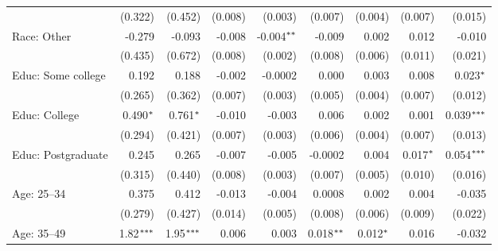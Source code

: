 \begin{table}[!ht]
\begin{adjustbox}{max width=\textwidth}
\begin{tabular}{@{\hspace{0\tabcolsep}}l*{8}{D{.}{.}{-1}}@{\hspace{0\tabcolsep}}}
                              & (0.322)       & (0.452)       & (0.008)       & (0.003)       & (0.007)                & (0.004)                & (0.007)       & (0.015)\\   
      Race: Other             & -0.279        & -0.093        & -0.008        & -0.004$\sym{**}$ & -0.009                 & 0.002                  & 0.012         & -0.010\\   
                              & (0.435)       & (0.672)       & (0.008)       & (0.002)       & (0.008)                & (0.006)                & (0.011)       & (0.021)\\   
      Educ: Some college      & 0.192         & 0.188         & -0.002        & -0.0002       & 0.000   & 0.003                  & 0.008         & 0.023$\sym{*}$\\   
                              & (0.265)       & (0.362)       & (0.007)       & (0.003)       & (0.005)                & (0.004)                & (0.007)       & (0.012)\\   
      Educ: College           & 0.490$\sym{*}$   & 0.761$\sym{*}$   & -0.010        & -0.003        & 0.006                  & 0.002                  & 0.001         & 0.039$\sym{***}$\\   
                              & (0.294)       & (0.421)       & (0.007)       & (0.003)       & (0.006)                & (0.004)                & (0.007)       & (0.013)\\   
      Educ: Postgraduate      & 0.245         & 0.265         & -0.007        & -0.005        & -0.0002                & 0.004                  & 0.017$\sym{*}$   & 0.054$\sym{***}$\\   
                              & (0.315)       & (0.440)       & (0.008)       & (0.003)       & (0.007)                & (0.005)                & (0.010)       & (0.016)\\   
      Age: 25--34             & 0.375         & 0.412         & -0.013        & -0.004        & 0.0008                 & 0.002                  & 0.004         & -0.035\\   
                              & (0.279)       & (0.427)       & (0.014)       & (0.005)       & (0.008)                & (0.006)                & (0.009)       & (0.022)\\   
      Age: 35--49             & 1.82$\sym{***}$  & 1.95$\sym{***}$  & 0.006         & 0.003         & 0.018$\sym{**}$           & 0.012$\sym{*}$            & 0.016         & -0.032\\   

\end{tabular}
\end{adjustbox}
\end{table}
